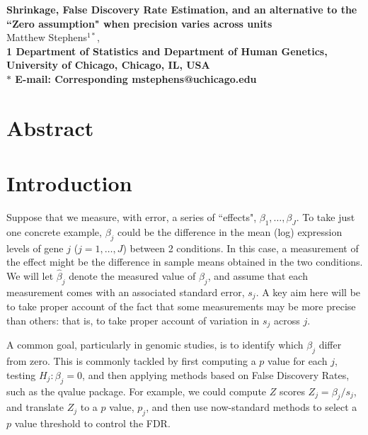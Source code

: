 \documentclass[10pt]{article}
\date{}
\begin{document}
\begin{flushleft}
{\Large
\textbf{Shrinkage, False Discovery Rate Estimation, and an alternative to the ``Zero assumption" when precision varies across units}
}
\\
Matthew Stephens$^{1*}$, 
\\
\bf{1} Department of Statistics and Department of Human Genetics, University of Chicago, Chicago, IL, USA
\\
$\ast$ E-mail: Corresponding mstephens@uchicago.edu
\end{flushleft}

\section*{Abstract}


\section*{Introduction}

Suppose that we measure, with error, a series of ``effects", $\beta_1,\dots,\beta_J$. To take just one concrete 
example, $\beta_j$ could be 
the difference in the mean (log) expression levels of gene $j$ ($j=1,\dots,J$) between 2 conditions. In this case, a measurement of
the effect might be the difference in sample means obtained in the two conditions. We will let $\hat\beta_j$ denote the measured value of $\beta_j$, and assume that
each measurement comes with an associated standard error, 
$s_j$. A key aim here will be to take proper account of the fact that some measurements may be more precise than others: that is, to take proper account of variation in $s_j$ across $j$.

A common goal, particularly in genomic studies, is to identify which $\beta_j$ differ from zero. This is commonly tackled
by first computing a $p$ value for each $j$, testing $H_j:\beta_j=0$, and then applying methods based on False Discovery Rates, such as the qvalue package. For example, we could compute $Z$ scores $Z_j = \beta_j/s_j$, and translate $Z_j$ to a $p$ value, 
$p_j$, and then use now-standard methods to select a $p$ value threshold to control the FDR. 
\end{document}
